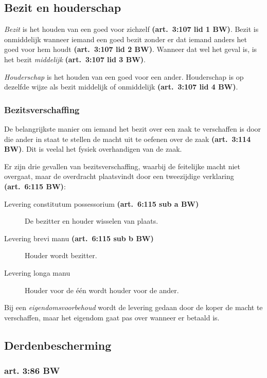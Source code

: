 \documentclass[a4paper]{article}
\newcommand{\art}[1]{\textbf{(art.~#1 BW)}\xspace}
\begin{document}
\subsection{Bezit en houderschap}

\emph{Bezit} is het houden van een goed voor zichzelf \art{3:107 lid 1}. Bezit
is onmiddelijk wanneer iemand een goed bezit zonder er dat iemand anders het
goed voor hem houdt \art{3:107 lid 2}. Wanneer dat wel het geval is, is het
bezit \emph{middelijk} \art{3:107 lid 3}.

\emph{Houderschap} is het houden van een goed voor een ander. Houderschap is
op dezelfde wijze als bezit middelijk of onmiddelijk \art{3:107 lid 4}.

\subsubsection{Bezitsverschaffing}

De belangrijkste manier om iemand het bezit over een zaak te verschaffen is
door die ander in staat te stellen de macht uit te oefenen over de zaak
\art{3:114}. Dit is veelal het fysiek overhandigen van de zaak.

Er zijn drie gevallen van bezitsverschaffing, waarbij de feitelijke macht niet
overgaat, maar de overdracht plaatsvindt door een tweezijdige verklaring
\art{6:115}:
\begin{description}

  \item[Levering constitutum possessorium \art{6:115 sub a}] De bezitter en
    houder wisselen van plaats.

  \item[Levering brevi manu \art{6:115 sub b}] Houder wordt bezitter.

  \item[Levering longa manu] Houder voor de \'e\'en wordt houder voor de
    ander.

\end{description}

Bij een \emph{eigendomsvoorbehoud} wordt de levering gedaan door de koper de
macht te verschaffen, maar het eigendom gaat pas over wanneer er betaald is.

\subsection{Derdenbescherming}

\subsubsection{art. 3:86 BW}
\end{document}
